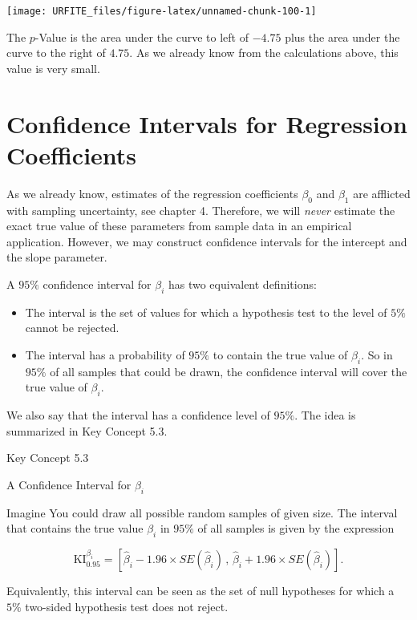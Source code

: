 \documentclass[]{book}
\providecommand{\tightlist}{%
  \setlength{\itemsep}{0pt}\setlength{\parskip}{0pt}}
\theoremstyle{definition}
\theoremstyle{definition}
\theoremstyle{definition}
\theoremstyle{remark}
\begin{document}
\begin{center}\texttt{[image: URFITE\_files/figure-latex/unnamed-chunk-100-1]} \end{center}

The \(p\)-Value is the area under the curve to left of \(-4.75\) plus
the area under the curve to the right of \(4.75\). As we already know
from the calculations above, this value is very small.

\section{Confidence Intervals for Regression
Coefficients}\label{confidence-intervals-for-regression-coefficients}

As we already know, estimates of the regression coefficients \(\beta_0\)
and \(\beta_1\) are afflicted with sampling uncertainty, see chapter 4.
Therefore, we will \emph{never} estimate the exact true value of these
parameters from sample data in an empirical application. However, we may
construct confidence intervals for the intercept and the slope
parameter.

A \(95\%\) confidence interval for \(\beta_i\) has two equivalent
definitions:

\begin{itemize}
\tightlist
\item
  The interval is the set of values for which a hypothesis test to the
  level of \(5\%\) cannot be rejected.
\item
  The interval has a probability of \(95\%\) to contain the true value
  of \(\beta_i\). So in \(95\%\) of all samples that could be drawn, the
  confidence interval will cover the true value of \(\beta_i\).
\end{itemize}

We also say that the interval has a confidence level of \(95\%\). The
idea is summarized in Key Concept 5.3.

Key Concept 5.3

A Confidence Interval for \(\beta_i\)

Imagine You could draw all possible random samples of given size. The
interval that contains the true value \(\beta_i\) in \(95\%\) of all
samples is given by the expression

\[ \text{KI}_{0.95}^{\beta_i} = \left[ \hat{\beta}_i - 1.96 \times SE(\hat{\beta}_i) \, , \, \hat{\beta}_i + 1.96 \times SE(\hat{\beta}_i) \right]. \]

Equivalently, this interval can be seen as the set of null hypotheses
for which a \(5\%\) two-sided hypothesis test does not reject.
\end{document}
